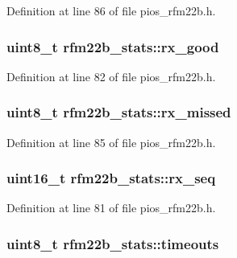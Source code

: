 \-Definition at line 86 of file pios\-\_\-rfm22b.\-h.

\hypertarget{structrfm22b__stats_aa9b17c04f89e42496f776f7cac5b549d}{
\subsubsection[{rx\-\_\-good}]{\setlength{\rightskip}{0pt plus 5cm}uint8\-\_\-t {\bf rfm22b\-\_\-stats\-::rx\-\_\-good}}}\label{structrfm22b__stats_aa9b17c04f89e42496f776f7cac5b549d}


\-Definition at line 82 of file pios\-\_\-rfm22b.\-h.

\hypertarget{structrfm22b__stats_a10156bfde7480e15c39ba077da5f687f}{
\subsubsection[{rx\-\_\-missed}]{\setlength{\rightskip}{0pt plus 5cm}uint8\-\_\-t {\bf rfm22b\-\_\-stats\-::rx\-\_\-missed}}}\label{structrfm22b__stats_a10156bfde7480e15c39ba077da5f687f}


\-Definition at line 85 of file pios\-\_\-rfm22b.\-h.

\hypertarget{structrfm22b__stats_ad73defbcdc26cc6438d0f28723a909e7}{
\subsubsection[{rx\-\_\-seq}]{\setlength{\rightskip}{0pt plus 5cm}uint16\-\_\-t {\bf rfm22b\-\_\-stats\-::rx\-\_\-seq}}}\label{structrfm22b__stats_ad73defbcdc26cc6438d0f28723a909e7}


\-Definition at line 81 of file pios\-\_\-rfm22b.\-h.

\hypertarget{structrfm22b__stats_ae710ec372ffa9365a23fcd2d8f9f8e0e}{
\subsubsection[{timeouts}]{\setlength{\rightskip}{0pt plus 5cm}uint8\-\_\-t {\bf rfm22b\-\_\-stats\-::timeouts}}}\label{structrfm22b__stats_ae710ec372ffa9365a23fcd2d8f9f8e0e}


